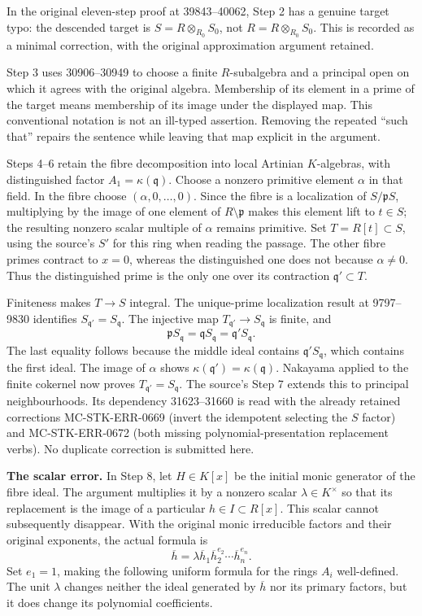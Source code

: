 In the original eleven-step proof at 39843--40062, Step 2 has a genuine target typo: the descended target is \(S=R\otimes_{R_0}S_0\), not \(R=R\otimes_{R_0}S_0\). This is recorded as a minimal correction, with the original approximation argument retained.

Step 3 uses 30906--30949 to choose a finite \(R\)-subalgebra and a principal open on which it agrees with the original algebra. Membership of its element in a prime of the target means membership of its image under the displayed map. This conventional notation is not an ill-typed assertion. Removing the repeated ``such that'' repairs the sentence while leaving that map explicit in the argument.

Steps 4--6 retain the fibre decomposition into local Artinian \(K\)-algebras, with distinguished factor \(A_1=\kappa(\mathfrak q)\). Choose a nonzero primitive element \(\alpha\) in that field. In the fibre choose \((\alpha,0,\ldots,0)\). Since the fibre is a localization of \(S/\mathfrak pS\), multiplying by the image of one element of \(R\setminus\mathfrak p\) makes this element lift to \(t\in S\); the resulting nonzero scalar multiple of \(\alpha\) remains primitive. Set \(T=R[t]\subset S\), using the source's \(S'\) for this ring when reading the passage. The other fibre primes contract to \(x=0\), whereas the distinguished one does not because \(\alpha\ne0\). Thus the distinguished prime is the only one over its contraction \(\mathfrak q'\subset T\).

Finiteness makes \(T\to S\) integral. The unique-prime localization result at 9797--9830 identifies \(S_{\mathfrak q'}=S_{\mathfrak q}\). The injective map \(T_{\mathfrak q'}\to S_{\mathfrak q}\) is finite, and \[
\mathfrak pS_{\mathfrak q}
=\mathfrak qS_{\mathfrak q}
=\mathfrak q'S_{\mathfrak q}.
\] The last equality follows because the middle ideal contains \(\mathfrak q'S_{\mathfrak q}\), which contains the first ideal. The image of \(\alpha\) shows \(\kappa(\mathfrak q')=\kappa(\mathfrak q)\). Nakayama applied to the finite cokernel now proves \(T_{\mathfrak q'}=S_{\mathfrak q}\). The source's Step 7 extends this to principal neighbourhoods. Its dependency 31623--31660 is read with the already retained corrections MC-STK-ERR-0669 (invert the idempotent selecting the \(S\) factor) and MC-STK-ERR-0672 (both missing polynomial-presentation replacement verbs). No duplicate correction is submitted here.

\textbf{The scalar error.} In Step 8, let \(H\in K[x]\) be the initial monic generator of the fibre ideal. The argument multiplies it by a nonzero scalar \(\lambda\in K^\times\) so that its replacement is the image of a particular \(h\in I\subset R[x]\). This scalar cannot subsequently disappear. With the original monic irreducible factors and their original exponents, the actual formula is \[
\overline h
=\lambda\overline h_1\overline h_2^{e_2}\cdots\overline h_n^{e_n}.
\] Set \(e_1=1\), making the following uniform formula for the rings \(A_i\) well-defined. The unit \(\lambda\) changes neither the ideal generated by \(\overline h\) nor its primary factors, but it does change its polynomial coefficients.

